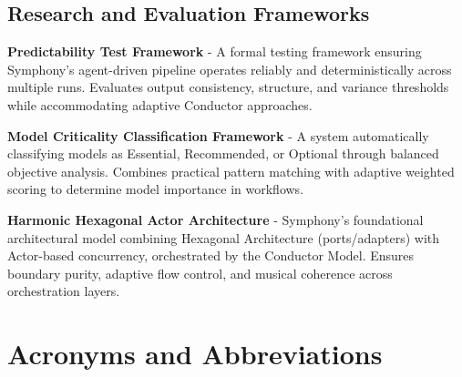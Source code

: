 \subsection*{Research and Evaluation Frameworks}

\begin{description}[leftmargin=4cm,labelwidth=3.5cm]

\item[\textbf{PDF}] \textbf{Predictability Test Framework} - A formal testing framework ensuring Symphony's agent-driven pipeline operates reliably and deterministically across multiple runs. Evaluates output consistency, structure, and variance thresholds while accommodating adaptive Conductor approaches.

\item[\textbf{MCCF}] \textbf{Model Criticality Classification Framework} - A system automatically classifying models as Essential, Recommended, or Optional through balanced objective analysis. Combines practical pattern matching with adaptive weighted scoring to determine model importance in workflows.

\item[\textbf{H²A²}] \textbf{Harmonic Hexagonal Actor Architecture} - Symphony's foundational architectural model combining Hexagonal Architecture (ports/adapters) with Actor-based concurrency, orchestrated by the Conductor Model. Ensures boundary purity, adaptive flow control, and musical coherence across orchestration layers.

\end{description}

\section*{Acronyms and Abbreviations}

